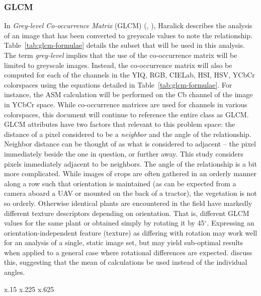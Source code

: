 \documentclass[letterpaper]{article}
\begin{document}
{\subsubsection{GLCM}
In \textit{Grey-level Co-occurrence Matrix} (GLCM) (\cite{Haralick1973-gr}, \cite{Hall-Beyer2017-nx}), Haralick describes the analysis of an image that has been converted to greyscale values to note the relationship. Table~\ref{tab:glcm-formulae} details the subset that will be used in this analysis. The term \textit{grey-level} implies that the use of the co-occurrence matrix will be limited to greyscale images. Instead, the co-occurrence matrix will also be computed for each of the channels in the YIQ, RGB, CIELab, HSI, HSV, YCbCr colorspaces using the equations detailed in Table~\ref{tab:glcm-formulae}. For instance, the ASM calculation will be performed on the Cb channel of the image in YCbCr space. While co-occurrence matrices are used for channels in various colorspaces, this document will continue to reference the entire class as GLCM. GLCM attributes have two factors that relevant to this problem space: the distance of a pixel  considered to be a \textit{neighbor} and the angle of the relationship. Neighbor distance can be thought of as what is considered to adjacent -- the pixel immediately beside the one in question, or further away. This study considers pixels immediately adjacent to be neighbors. The angle of the relationship is a bit more complicated. While images of crops are often gathered in an orderly manner along a row such that orientation is maintained (as can be expected from a camera aboard a UAV or mounted on the back of a tractor), the vegetation is not so orderly. Otherwise identical plants are encountered in the field have markedly different texture descriptors depending on orientation. That is, different GLCM values for the same plant or obtained simply by rotating it by 45$^{\circ}$. Expressing an orientation-independent feature (texture) as differing with rotation may work well for an analysis of a single, static image set, but may yield sub-optimal results when applied to a general case where rotational differences are expected. \citeauthor*{Haralick1973-gr} discuss this, suggesting that the mean of calculations be used instead of the individual angles. 
\begin{longtable}{x{\dimexpr.15\tabcolsep}
                  x{\dimexpr.225\tabcolsep}
                  x{\dimexpr.625\tabcolsep}}
    \caption{GLCM Formulae}\label{tab:glcm-formulae}  \\

\end{longtable}}
\end{document}
